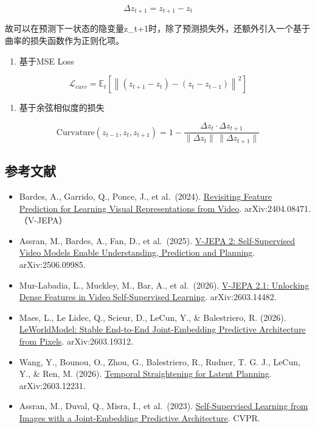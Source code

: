 \[
\Delta z_{t+1} = z_{t+1} - z_t
\]

故可以在预测下一状态的隐变量z\_t+1时，除了预测损失外，还额外引入一个基于曲率的损失函数作为正则化项。

\begin{enumerate}
\def\labelenumi{\arabic{enumi}.}
\tightlist
\item
  基于MSE Loss
\end{enumerate}

\[
\mathcal{L}_{curv} = \mathbb{E}_t\left[\left\| (z_{t+1}-z_t) - (z_t-z_{t-1}) \right\|^2\right]
\]

\begin{enumerate}
\def\labelenumi{\arabic{enumi}.}
\setcounter{enumi}{1}
\tightlist
\item
  基于余弦相似度的损失
\end{enumerate}

\[
\mathrm{Curvature}(z_{t-1}, z_t, z_{t+1}) = 1 - \frac{\Delta z_t \cdot \Delta z_{t+1}}{\|\Delta z_t\|\,\|\Delta z_{t+1}\|}
\]

\hypertarget{ux53c2ux8003ux6587ux732e-157}{%
\subsection{参考文献}\label{ux53c2ux8003ux6587ux732e-157}}

\vspace{0.25em}
\begin{itemize}
\tightlist
\item
  Bardes, A., Garrido, Q., Ponce, J., et al.~(2024). \href{https://arxiv.org/abs/2404.08471}{Revisiting Feature Prediction for Learning Visual Representations from Video}. arXiv:2404.08471.（V-JEPA）
\item
  Assran, M., Bardes, A., Fan, D., et al.~(2025). \href{https://arxiv.org/abs/2506.09985}{V-JEPA 2: Self-Supervised Video Models Enable Understanding, Prediction and Planning}. arXiv:2506.09985.
\item
  Mur-Labadia, L., Muckley, M., Bar, A., et al.~(2026). \href{https://arxiv.org/abs/2603.14482}{V-JEPA 2.1: Unlocking Dense Features in Video Self-Supervised Learning}. arXiv:2603.14482.
\item
  Maes, L., Le Lidec, Q., Scieur, D., LeCun, Y., \& Balestriero, R. (2026). \href{https://arxiv.org/abs/2603.19312}{LeWorldModel: Stable End-to-End Joint-Embedding Predictive Architecture from Pixels}. arXiv:2603.19312.
\item
  Wang, Y., Bounou, O., Zhou, G., Balestriero, R., Rudner, T. G. J., LeCun, Y., \& Ren, M. (2026). \href{https://arxiv.org/abs/2603.12231}{Temporal Straightening for Latent Planning}. arXiv:2603.12231.
\item
  Assran, M., Duval, Q., Misra, I., et al.~(2023). \href{https://arxiv.org/abs/2301.08243}{Self-Supervised Learning from Images with a Joint-Embedding Predictive Architecture}. CVPR.
\end{itemize}

\clearpage
